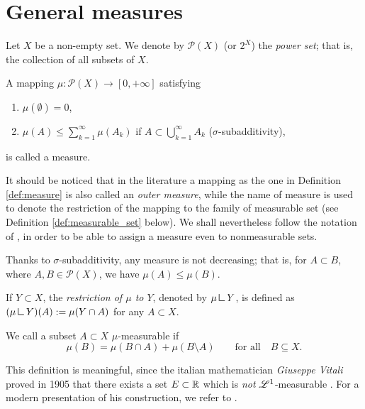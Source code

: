 \section{General measures}

Let $X$ be a non-empty set. We denote by $\mathcal{P}(X)$ (or $2^X$) the
\emph{power set}; that is, the collection of all subsets of $X$.

\begin{definition}[Measures] \label{def:measure}
A mapping $\mu : \mathcal{P}(X) \to [0,+\infty]$ satisfying
\begin{enumerate}[(1)]
\item $\mu(\emptyset) = 0$, 
\item $\mu(A) \leq \sum_{k=1}^\infty \mu(A_k)$ if $A \subset
\bigcup_{k=1}^\infty A_k$ ($\sigma$-subadditivity),
\end{enumerate}
is called a measure.
\end{definition}

It should be noticed that in the literature a mapping as the one in Definition \ref{def:measure} is also called an {\em outer measure}, while the name of measure is used to denote the restriction of the mapping to the family of measurable set (see Definition \ref{def:measurable_set} below). We shall nevertheless follow the notation of \cite{evans2015measure}, in order to be able to assign a measure even to nonmeasurable sets.

\begin{remark}
Thanks to $\sigma$-subadditivity, any measure is not decreasing; that is, for $A\subset B$, where $A,B \in \mathcal{P}(X)$, we have $\mu(A) \leq \mu(B)$. 
\end{remark}

\begin{definition} If $Y \subset X$, the
\emph{restriction of $\mu$ to $Y$}, denoted by $\mu \mres Y$,
is defined as $(\mu \mres Y)(A) := \mu(Y\cap A)$ for any $A \subset X$.
\end{definition}

\begin{definition} \label{def:measurable_set} 
We call a subset $A \subset X$
$\mu$-measurable if 
\[
\mu(B) = \mu(B\cap A) + \mu(B \setminus A)
\qquad \text{for all} \quad B \subseteq X.
\]
\end{definition}

\begin{remark}
This definition is meaningful, since the italian mathematician \emph{Giuseppe Vitali} proved in 1905 that there exists a set
$E \subset \mathbb{R}$ which is \emph{not} $\mathscr{L}^{1}$-measurable \cite{vitali1905sul}. For a modern presentation of his construction, we refer to \cite[Section I.1.2]{maggi2012sets}.
\end{remark}

